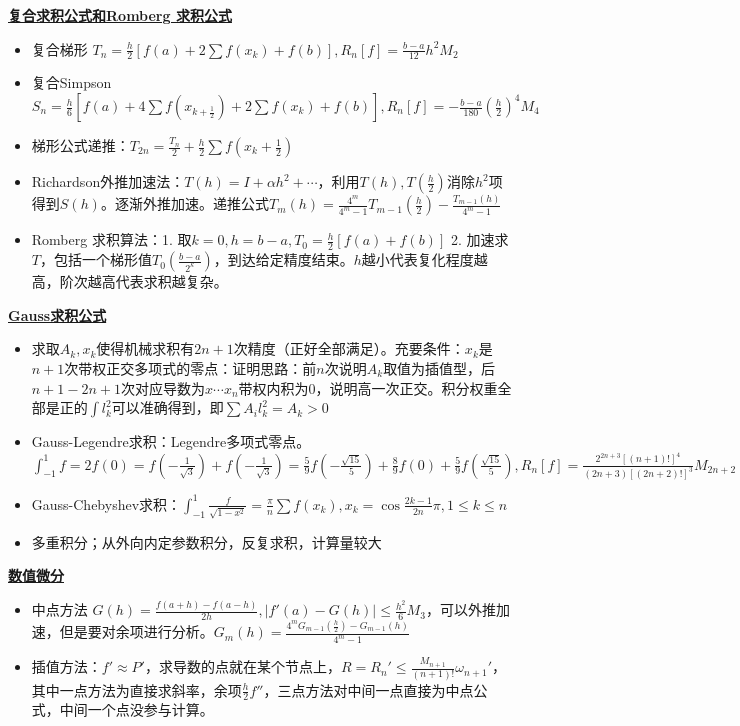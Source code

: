 \documentclass[UTF8,a4paper,landscape,compress]{paper}
\renewcommand{\subsection}[1]{{\small\textbf{\underline{#1}}}\\ }
\newcommand{\List}[1]{\begin{itemize}[fullwidth,itemindent=0em] #1 \end{itemize}}
\begin{document}
\begin{multicols}{4}
    \subsection{复合求积公式和Romberg 求积公式}
    \List{
        \item {复合梯形 $T_n = \frac{h}{2}[f(a) + 2 \sum f(x_k) + f(b)], R_n[f] = \frac{b-a}{12}h^2M_2$}
        \item {复合Simpson $S_n = \frac{h}{6}[f(a) + 4 \sum f(x_{k+\frac12}) + 2\sum f(x_k) + f(b)],R_n[f] = -\frac{b-a}{180}(\frac{h}{2})^4M_4$}
        \item {梯形公式递推：$T_{2n} = \frac{T_n}{2} + \frac{h}{2}\sum f(x_k+\frac12)$}
        \item {Richardson外推加速法：$T(h) = I + \alpha h^2 + \cdots $，利用$T(h),T(\frac h2)$消除$h^2$项得到$S(h)$。逐渐外推加速。递推公式$T_m(h) = \frac{4^m}{4^m-1}T_{m-1}(\frac h2) - \frac {T_{m-1}(h)}{4^m-1}$}
        \item {Romberg 求积算法：1. 取$k=0,h=b-a,T_0=\frac h2[f(a)+f(b)]$ 2. 加速求$T$，包括一个梯形值$T_0(\frac{b-a}{2^k})$，到达给定精度结束。$h$越小代表复化程度越高，阶次越高代表求积越复杂。} 
    }
    \subsection{Gauss求积公式}
    \List{
        \item {求取$A_k,x_k$使得机械求积有$2n+1$次精度（正好全部满足）。充要条件：$x_k$是$n+1$次带权正交多项式的零点：证明思路：前$n$次说明$A_k$取值为插值型，后$n+1 - 2n+1 $次对应导数为$x \cdots x_n$带权内积为0，说明高一次正交。积分权重全部是正的$\int l_k^2$可以准确得到，即$\sum A_il_k^2 = A_k >0$}
        \item {Gauss-Legendre求积：Legendre多项式零点。$\int^1_{-1}f = 2f(0) = f(-\frac{1}{\sqrt{3}}) + f(-\frac{1}{\sqrt{3}}) = \frac59f(-\frac{\sqrt{15}}5) + \frac89f(0) + \frac59f(\frac{\sqrt{15}}5), R_n[f] = \frac{2^{2n+3}[(n+1)!]^4}{(2n+3)[(2n+2)!]^3}M_{2n+2}$}
        \item {Gauss-Chebyshev求积：$\int_{-1}^1 \frac f{\sqrt{1-x^2}} = \frac \pi n\sum f(x_k), x_k = \cos\frac{2k-1}{2n}\pi, 1 \le k \le n$}
        \item {多重积分；从外向内定参数积分，反复求积，计算量较大}
    }
    \subsection{数值微分}
    \List{
        \item {中点方法 $G(h) = \frac{f(a+h) - f(a-h)}{2h}, |f'(a) -G(h)| \le \frac{h^2}{6}M_3$，可以外推加速，但是要对余项进行分析。$G_m(h) = \frac{4^mG_{m-1}(\frac h2) - G_{m-1}(h)}{4^m-1}$}
        \item {插值方法：$f' \approx P'$，求导数的点就在某个节点上，$R = R_n' \le \frac{M_{n+1}}{(n+1)!}\omega_{n+1}'$，其中一点方法为直接求斜率，余项$\frac h2 f''$，三点方法对中间一点直接为中点公式，中间一个点没参与计算。}
    }

\end{multicols}
\end{document}
